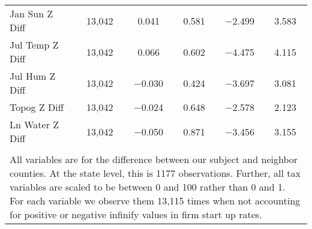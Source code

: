 \begin{table}[!htbp]
\begin{tabular}{@{\extracolsep{5pt}}lccccc}
Jan Sun Z Diff & 13,042 & 0.041 & 0.581 & $-$2.499 & 3.583 \\ 
Jul Temp Z Diff & 13,042 & 0.066 & 0.602 & $-$4.475 & 4.115 \\ 
Jul Hum Z Diff & 13,042 & $-$0.030 & 0.424 & $-$3.697 & 3.081 \\ 
Topog Z Diff & 13,042 & $-$0.024 & 0.648 & $-$2.578 & 2.123 \\ 
Ln Water Z Diff & 13,042 & $-$0.050 & 0.871 & $-$3.456 & 3.155 \\ 
\hline \\[-1.8ex] 
\multicolumn{6}{l}{All variables are for the difference between our subject and neighbor counties. At the state level, this is 1177 observations. Further, all tax variables are scaled to be between 0 and 100 rather than 0 and 1. For each variable we observe them 13,115 times when not accounting for positive or negative infinify values in firm start up rates.} \\ 
\end{tabular} 
\end{table} 
